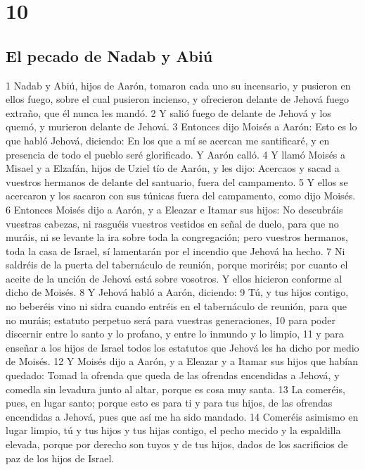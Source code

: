 \chapter{10}

\section*{El pecado de Nadab y Abiú}

1 Nadab y Abiú, hijos de Aarón, tomaron cada uno su incensario, y pusieron en ellos fuego, sobre el cual pusieron incienso, y ofrecieron delante de Jehová fuego extraño, que él nunca les mandó.
2 Y salió fuego de delante de Jehová y los quemó, y murieron delante de Jehová.
3 Entonces dijo Moisés a Aarón: Esto es lo que habló Jehová, diciendo: En los que a mí se acercan me santificaré, y en presencia de todo el pueblo seré glorificado. Y Aarón calló.
4 Y llamó Moisés a Misael y a Elzafán, hijos de Uziel tío de Aarón, y les dijo: Acercaos y sacad a vuestros hermanos de delante del santuario, fuera del campamento.
5 Y ellos se acercaron y los sacaron con sus túnicas fuera del campamento, como dijo Moisés.
6 Entonces Moisés dijo a Aarón, y a Eleazar e Itamar sus hijos: No descubráis vuestras cabezas, ni rasguéis vuestros vestidos en señal de duelo, para que no muráis, ni se levante la ira sobre toda la congregación; pero vuestros hermanos, toda la casa de Israel, sí lamentarán por el incendio que Jehová ha hecho.
7 Ni saldréis de la puerta del tabernáculo de reunión, porque moriréis; por cuanto el aceite de la unción de Jehová está sobre vosotros. Y ellos hicieron conforme al dicho de Moisés.
8 Y Jehová habló a Aarón, diciendo:
9 Tú, y tus hijos contigo, no beberéis vino ni sidra cuando entréis en el tabernáculo de reunión, para que no muráis; estatuto perpetuo será para vuestras generaciones,
10 para poder discernir entre lo santo y lo profano, y entre lo inmundo y lo limpio,
11 y para enseñar a los hijos de Israel todos los estatutos que Jehová les ha dicho por medio de Moisés.
12 Y Moisés dijo a Aarón, y a Eleazar y a Itamar sus hijos que habían quedado: Tomad la ofrenda que queda de las ofrendas encendidas a Jehová, y comedla sin levadura junto al altar, porque es cosa muy santa.
13 La comeréis, pues, en lugar santo; porque esto es para ti y para tus hijos, de las ofrendas encendidas a Jehová, pues que así me ha sido mandado.
14 Comeréis asimismo en lugar limpio, tú y tus hijos y tus hijas contigo, el pecho mecido y la espaldilla elevada, porque por derecho son tuyos y de tus hijos, dados de los sacrificios de paz de los hijos de Israel.
